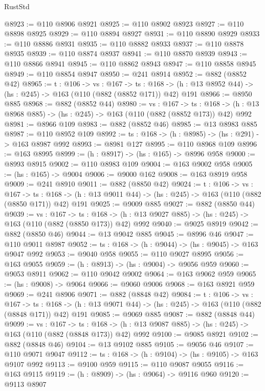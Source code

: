 \begin{lexlean}{RustStd}
\begin{coremodule}
@8923 := @110 @8906 @8921
@8925 := @110 @8902 @8923
@8927 := @110 @8898 @8925
@8929 := @110 @8894 @8927
@8931 := @110 @8890 @8929
@8933 := @110 @8886 @8931
@8935 := @110 @8882 @8933
@8937 := @110 @8878 @8935
@8939 := @110 @8874 @8937
@8941 := @110 @8870 @8939
@8943 := @110 @8866 @8941
@8945 := @110 @8862 @8943
@8947 := @110 @8858 @8945
@8949 := @110 @8854 @8947
@8950 := @241 @8914
@8952 := @882 (@8852 @42)
@8965 := {t : @106} ->
  {vs : @167} ->
  {ts : @168} -> (h : @13 @8952 @44) -> (hs : @245) -> @163 (@110 (@882 (@8852 @171)) @42) @191
@8966 := @8950 @885
@8968 := @882 (@8852 @44)
@8980 := {vs : @167} ->
  {ts : @168} -> (h : @13 @8968 @885) -> (hs : @245) -> @163 (@110 (@882 (@8852 @173)) @42) @992
@8981 := @8966 @109
@8983 := @882 (@8852 @46)
@8985 := @13 @8983 @885
@8987 := @110 @8952 @109
@8992 := {ts : @168} -> (h : @8985) -> (hs : @291) -> @163 @8987 @992
@8993 := @8981 @127
@8995 := @110 @8968 @109
@8996 := @163 @8995
@8999 := (h : @8917) -> (hs : @165) -> @8996 @958
@9000 := @8993 @8915
@9002 := @110 @8983 @109
@9004 := @163 @9002 @958
@9005 := (hs : @165) -> @9004
@9006 := @9000 @162
@9008 := @163 @8919 @958
@9009 := @241 @8910
@9011 := @882 (@8850 @42)
@9024 := {t : @106} ->
  {vs : @167} ->
  {ts : @168} -> (h : @13 @9011 @44) -> (hs : @245) -> @163 (@110 (@882 (@8850 @171)) @42) @191
@9025 := @9009 @885
@9027 := @882 (@8850 @44)
@9039 := {vs : @167} ->
  {ts : @168} -> (h : @13 @9027 @885) -> (hs : @245) -> @163 (@110 (@882 (@8850 @173)) @42) @992
@9040 := @9025 @8919
@9042 := @882 (@8850 @46)
@9044 := @13 @9042 @885
@9045 := @8996 @46
@9047 := @110 @9011 @8987
@9052 := {ts : @168} -> (h : @9044) -> (hs : @9045) -> @163 @9047 @992
@9053 := @9040 @958
@9055 := @110 @9027 @8995
@9056 := @163 @9055
@9059 := (h : @8913) -> (hs : @9004) -> @9056 @959
@9060 := @9053 @8911
@9062 := @110 @9042 @9002
@9064 := @163 @9062 @959
@9065 := (hs : @9008) -> @9064
@9066 := @9060 @9006
@9068 := @163 @8921 @959
@9069 := @241 @8906
@9071 := @882 (@8848 @42)
@9084 := {t : @106} ->
  {vs : @167} ->
  {ts : @168} -> (h : @13 @9071 @44) -> (hs : @245) -> @163 (@110 (@882 (@8848 @171)) @42) @191
@9085 := @9069 @885
@9087 := @882 (@8848 @44)
@9099 := {vs : @167} ->
  {ts : @168} -> (h : @13 @9087 @885) -> (hs : @245) -> @163 (@110 (@882 (@8848 @173)) @42) @992
@9100 := @9085 @8921
@9102 := @882 (@8848 @46)
@9104 := @13 @9102 @885
@9105 := @9056 @46
@9107 := @110 @9071 @9047
@9112 := {ts : @168} -> (h : @9104) -> (hs : @9105) -> @163 @9107 @992
@9113 := @9100 @959
@9115 := @110 @9087 @9055
@9116 := @163 @9115
@9119 := (h : @8909) -> (hs : @9064) -> @9116 @960
@9120 := @9113 @8907

\end{coremodule}
\end{lexlean}
